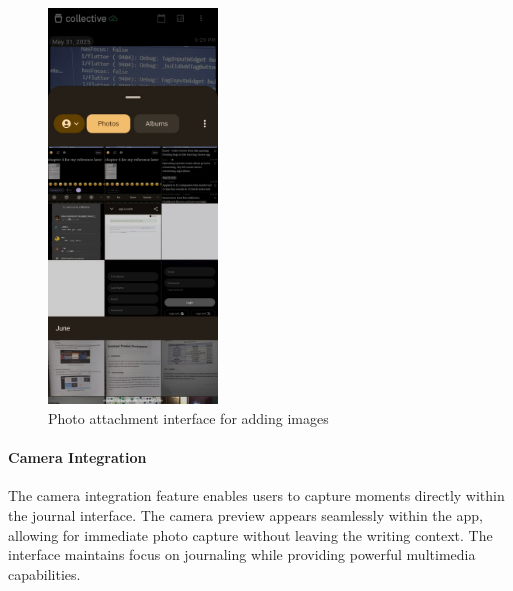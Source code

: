 \begin{figure}[H]
\centering
\includegraphics[width=0.4\textwidth]{files/imgs/prototype/photo_attachment.jpeg}
\caption{Photo attachment interface for adding images}
\label{fig:photo-attachment}
\end{figure}

\paragraph{Camera Integration}

The camera integration feature enables users to capture moments directly within the journal interface. The camera preview appears seamlessly within the app, allowing for immediate photo capture without leaving the writing context. The interface maintains focus on journaling while providing powerful multimedia capabilities.

